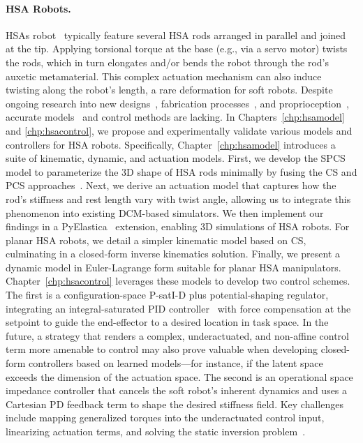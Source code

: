 \paragraph{HSA Robots.}
\glspl{HSA} robot~\citep{lipton2018handedness, chin2018compliant} typically feature several \gls{HSA} rods arranged in parallel and joined at the tip. Applying torsional torque at the base (e.g., via a servo motor) twists the rods, which in turn elongates and/or bends the robot through the rod’s auxetic metamaterial. This complex actuation mechanism can also induce twisting along the robot’s length, a rare deformation for soft robots. Despite ongoing research into new designs~\citep{good2022expanding, good2025torque}, fabrication processes~\citep{truby2021recipe}, and proprioception~\citep{zhang2022vision}, accurate models~\citep{garg2022kinematic} and control methods are lacking. In Chapters~\ref{chp:hsamodel} and \ref{chp:hsacontrol}, we propose and experimentally validate various models and controllers for \gls{HSA} robots.
%
Specifically, Chapter~\ref{chp:hsamodel} introduces a suite of kinematic, dynamic, and actuation models. First, we develop the \gls{SPCS} model to parameterize the 3D shape of \gls{HSA} rods minimally by fusing the \gls{CS} and \gls{PCS} approaches~\citep{renda2018discrete}. Next, we derive an actuation model that captures how the rod’s stiffness and rest length vary with twist angle, allowing us to integrate this phenomenon into existing \gls{DCM}-based simulators. We then implement our findings in a PyElastica~\citep{naughton2021elastica} extension, enabling 3D simulations of \gls{HSA} robots. For planar \gls{HSA} robots, we detail a simpler kinematic model based on \gls{CS}, culminating in a closed-form inverse kinematics solution. Finally, we present a dynamic model in Euler-Lagrange form suitable for planar \gls{HSA} manipulators.
%
Chapter~\ref{chp:hsacontrol} leverages these models to develop two control schemes. The first is a configuration-space P-satI-D plus potential-shaping regulator, integrating an integral-saturated PID controller~\citep{pustina2022p} with force compensation at the setpoint to guide the end-effector to a desired location in task space. 
In the future, a strategy that renders a complex, underactuated, and non-affine control term more amenable to control may also prove valuable when developing closed-form controllers based on learned models—for instance, if the latent space exceeds the dimension of the actuation space.
The second is an operational space impedance controller that cancels the soft robot’s inherent dynamics and uses a Cartesian PD feedback term to shape the desired stiffness field. Key challenges include mapping generalized torques into the underactuated control input, linearizing actuation terms, and solving the static inversion problem~\citep{della2025pushing}.

